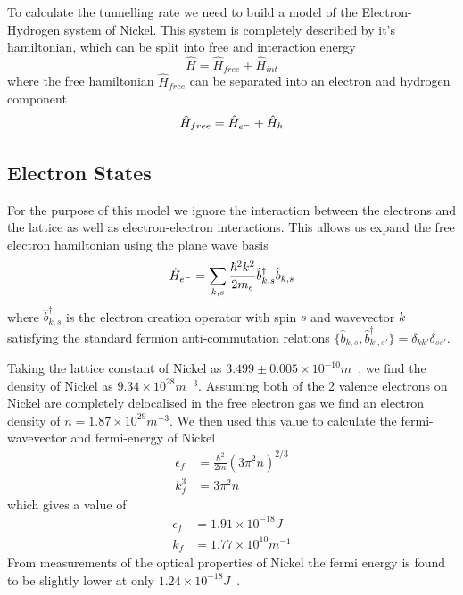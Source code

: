 To calculate the tunnelling rate we
need to build a model of the Electron-Hydrogen
system of Nickel. This system is completely
described by it's hamiltonian, which can be
split into free and interaction energy
\begin{equation}
    \hat{H} = \hat{H}_{free} + \hat{H}_{int}
\end{equation}
where the free hamiltonian \(\hat{H}_{free}\)
can be separated
into an electron and hydrogen component
\begin{equation}
    \hat{H}_{free} =
    \hat{H}_{e^-} + \hat{H}_{h}\\
\end{equation}



\subsection{Electron States}\label{sec:electron states}
For the purpose of this model we ignore the
interaction between the electrons
and the lattice as well as electron-electron
interactions. This allows
us expand the free electron
hamiltonian using the plane wave
basis
\begin{equation}
    \hat{H}_{e^-} = \sum_{k, s}
    \frac{\hbar^2 k^2}{2m_e} \hat{b}^\dagger_{k, s} \hat{b}_{k, s}\\
\end{equation}
where \(\hat{b}^\dagger_{k, s}\)
is the electron creation operator
with spin \(s\) and wavevector
\(k\) satisfying the standard
fermion anti-commutation relations
\( \{ \hat{b}_{k, s}, \hat{b}^\dagger_{k', s'} \}
= \delta_{k k'} \delta_{s s'}\).

Taking the lattice constant of Nickel as
\(3.499\pm{}0.005\times{}10^{-10}m\)~\cite{PhysRev.25.753},
we find the density of Nickel as
\(9.34\times{}10^{28}m^{-3}\).
Assuming both of the 2 valence
electrons on Nickel are completely
delocalised in
the free electron gas we
find an electron density of
\(n = 1.87\times{}10^{29} m^{-3}\).
We then used this value to calculate
the fermi-wavevector and fermi-energy of
Nickel~\cite{KittelCharles1953Itss}
\begin{align}
    \epsilon_f & = \frac{\hbar^2}{2m} {(3\pi^2n)}^{2/3} \\
    k_f^3      & = 3 \pi^2 n
\end{align}
which gives a value of
\begin{align}
    \epsilon_f & = 1.91\times{}10^{-18}J                                  \\
    k_f        & = 1.77\times{}10^{10}m^{-1} \label{eqn:fermi wavevector}
\end{align}
From measurements of the optical
properties of Nickel the
fermi energy is found to
be slightly lower
at only
\(1.24\times{} 10^{-18}J\)~\cite{PhysRev.131.2469}.

